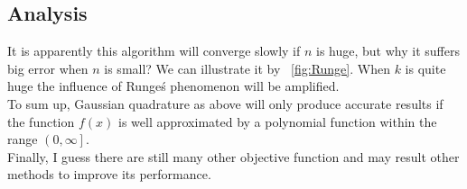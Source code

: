 \documentclass[
10pt, %
a4paper, %
oneside, %
headinclude,footinclude, %
BCOR5mm, %
]{scrartcl}
\theoremstyle{definition}
\begin{document}
\subsection{Analysis}
It is apparently this algorithm will converge slowly if $n$ is huge, but why it suffers  big error when $n$ is small? We can illustrate it by ~\vref{fig:Runge}.
When $k$ is quite huge the influence of Runge\'s phenomenon will be amplified.
\\To sum up, Gaussian quadrature as above will only produce accurate results if the function $f(x)$ is well approximated by a polynomial function within the range $\left(0, \infty\right]$.
\\Finally, I guess  there are still many other objective function and may result other methods to improve its performance.\\
\end{document}
